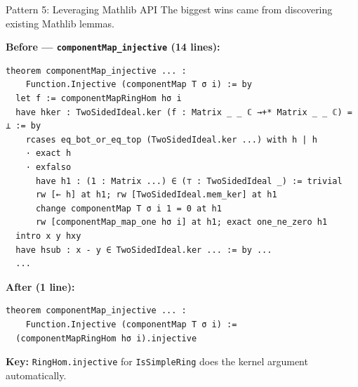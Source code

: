 \documentclass[aspectratio=169,10pt]{beamer}
\begin{document}
\begin{frame}[fragile,shrink=2]{Pattern 5: Leveraging Mathlib API}
    \vspace{-0.3em}
    The biggest wins came from discovering existing Mathlib lemmas.

    \vspace{0.2em}
    \textbf{\textcolor{softred}{Before} --- \texttt{componentMap\_injective} (14 lines):}
    \begin{lstlisting}[basicstyle=\ttfamily\fontsize{5pt}{6pt}\selectfont\color{white}]
theorem componentMap_injective ... :
    Function.Injective (componentMap T σ i) := by
  let f := componentMapRingHom hσ i
  have hker : TwoSidedIdeal.ker (f : Matrix _ _ ℂ →+* Matrix _ _ ℂ) = ⊥ := by
    rcases eq_bot_or_eq_top (TwoSidedIdeal.ker ...) with h | h
    · exact h
    · exfalso
      have h1 : (1 : Matrix ...) ∈ (⊤ : TwoSidedIdeal _) := trivial
      rw [← h] at h1; rw [TwoSidedIdeal.mem_ker] at h1
      change componentMap T σ i 1 = 0 at h1
      rw [componentMap_map_one hσ i] at h1; exact one_ne_zero h1
  intro x y hxy
  have hsub : x - y ∈ TwoSidedIdeal.ker ... := by ...
  ...
    \end{lstlisting}

    \textbf{\textcolor{leangreen}{After} (1 line):}
    \begin{lstlisting}
theorem componentMap_injective ... :
    Function.Injective (componentMap T σ i) :=
  (componentMapRingHom hσ i).injective
    \end{lstlisting}

    {\small \textbf{Key:} \texttt{RingHom.injective} for \texttt{IsSimpleRing} does the kernel argument automatically.}
\end{frame}
\end{document}
